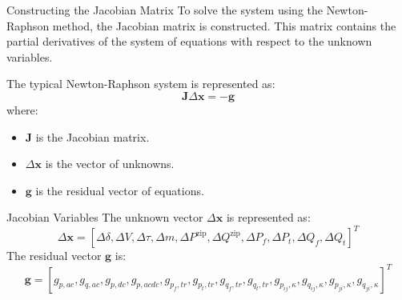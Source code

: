 \begin{frame}{Constructing the Jacobian Matrix}
    To solve the system using the Newton-Raphson method, the Jacobian matrix is constructed. This matrix contains the partial derivatives of the system of equations with respect to the unknown variables.
    
    The typical Newton-Raphson system is represented as:
    \[
        \mathbf{J} \Delta \mathbf{x} = -\mathbf{g}
    \]
    where:
    \begin{itemize}
        \item $\mathbf{J}$ is the Jacobian matrix.
        \item $\Delta \mathbf{x}$ is the vector of unknowns.
        \item $\mathbf{g}$ is the residual vector of equations.
    \end{itemize}
\end{frame}
\begin{frame}{Jacobian Variables}
    The unknown vector $\Delta \mathbf{x}$ is represented as:
    \[
    \Delta \mathbf{x} =
    [\Delta \delta, \Delta V, \Delta \tau, \Delta m, \Delta P^\text{zip}, \Delta Q^\text{zip}, \Delta P_f, \Delta P_t, \Delta Q_f, \Delta Q_t]^T
    \]
    The residual vector $\mathbf{g}$ is:
    \[
    \mathbf{g} =
    [g_{p,ac}, g_{q,ac}, g_{p,dc}, g_{p,acdc}, g_{p_f,tr}, g_{p_t,tr}, g_{q_f,tr}, g_{q_t,tr}, g_{p_{ij}, \kappa}, g_{q_{ij}, \kappa}, g_{p_{ji}, \kappa}, g_{q_{ji}, \kappa}]^T
    \]
\end{frame}



